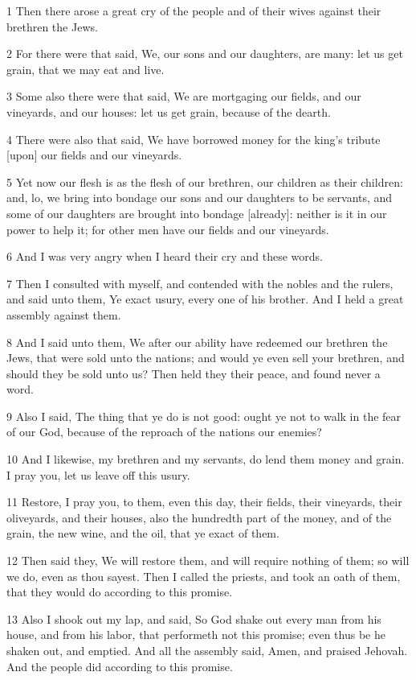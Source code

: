 \par 1 Then there arose a great cry of the people and of their wives against their brethren the Jews.
\par 2 For there were that said, We, our sons and our daughters, are many: let us get grain, that we may eat and live.
\par 3 Some also there were that said, We are mortgaging our fields, and our vineyards, and our houses: let us get grain, because of the dearth.
\par 4 There were also that said, We have borrowed money for the king's tribute [upon] our fields and our vineyards.
\par 5 Yet now our flesh is as the flesh of our brethren, our children as their children: and, lo, we bring into bondage our sons and our daughters to be servants, and some of our daughters are brought into bondage [already]: neither is it in our power to help it; for other men have our fields and our vineyards.
\par 6 And I was very angry when I heard their cry and these words.
\par 7 Then I consulted with myself, and contended with the nobles and the rulers, and said unto them, Ye exact usury, every one of his brother. And I held a great assembly against them.
\par 8 And I said unto them, We after our ability have redeemed our brethren the Jews, that were sold unto the nations; and would ye even sell your brethren, and should they be sold unto us? Then held they their peace, and found never a word.
\par 9 Also I said, The thing that ye do is not good: ought ye not to walk in the fear of our God, because of the reproach of the nations our enemies?
\par 10 And I likewise, my brethren and my servants, do lend them money and grain. I pray you, let us leave off this usury.
\par 11 Restore, I pray you, to them, even this day, their fields, their vineyards, their oliveyards, and their houses, also the hundredth part of the money, and of the grain, the new wine, and the oil, that ye exact of them.
\par 12 Then said they, We will restore them, and will require nothing of them; so will we do, even as thou sayest. Then I called the priests, and took an oath of them, that they would do according to this promise.
\par 13 Also I shook out my lap, and said, So God shake out every man from his house, and from his labor, that performeth not this promise; even thus be he shaken out, and emptied. And all the assembly said, Amen, and praised Jehovah. And the people did according to this promise.
